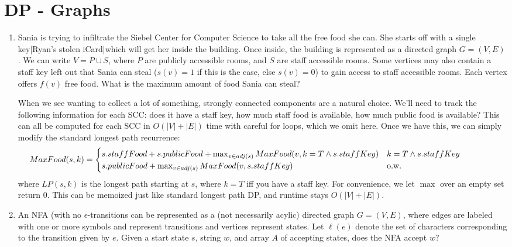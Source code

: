 \documentclass[fleqn]{article}
\begin{document}
\section{DP - Graphs}
\begin{enumerate}
    \item Sania is trying to infiltrate the Siebel Center for Computer Science to take all the free food she can. She starts off with a single key|Ryan's stolen iCard|which will get her inside the building. Once inside, the building is represented as a directed graph $G = (V, E)$. We can write $V = P \cup S$, where $P$ are publicly accessible rooms, and $S$ are staff accessible rooms. Some vertices may also contain a staff key left out that Sania can steal ($s(v) = 1$ if this is the case, else $s(v) = 0$) to gain access to staff accessible rooms. Each vertex offers $f(v)$ free food. What is the maximum amount of food Sania can steal?
    \begin{answer}
        When we see wanting to collect a lot of something, strongly connected components are a natural choice. We'll need to track the following information for each SCC: does it have a staff key, how much staff food is available, how much public food is available? This can all be computed for each SCC in $O(|V| + |E|)$ time with careful for loops, which we omit here. Once we have this, we can simply modify the standard longest path recurrence:
        \[
            \mkern-75mu MaxFood(s, k) = \begin{cases}
               s.staffFood + s.publicFood + \max_{v \in adj(s)}MaxFood(v, k = T \wedge s.staffKey) & k = T \wedge s.staffKey \\
               s.publicFood + \max_{v \in adj(s)}MaxFood(v, s.staffKey) & \text{o.w.}
            \end{cases}
        \]
        where $LP(s,k)$ is the longest path starting at $s$, where $k=T$ iff you have a staff key. For convenience, we let $\max$ over an empty set return $0$. This can be memoized just like standard longest path DP, and runtime stays $O(|V| + |E|)$.
    \end{answer}
    \item An NFA (with no $\epsilon$-transitions can be represented as a (not necessarily acylic) directed graph $G = (V, E)$, where edges are labeled with one or more symbols and represent transitions and vertices represent states. Let $\ell(e)$ denote the set of characters corresponding to the transition given by $e$. Given a start state $s$, string $w$, and array $A$ of accepting states, does the NFA accept $w$?

\end{enumerate}
\end{document}
